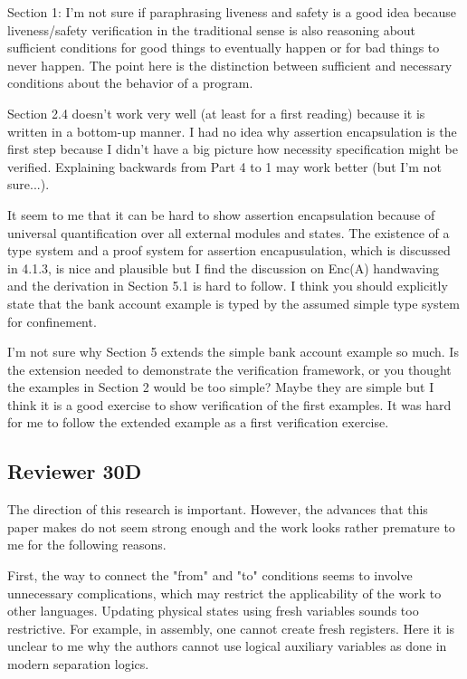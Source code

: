 \documentclass[11pt]{amsart}
\begin{document}
Section 1: I'm not sure if paraphrasing liveness and safety is a good
idea because liveness/safety verification in the traditional sense is
also reasoning about sufficient conditions for good things to
eventually happen or for bad things to never happen.  The point
here is the distinction between sufficient and necessary conditions
about the behavior of a program.

Section 2.4 doesn't work very well (at least for a first reading)
because it is written in a bottom-up manner.  I had no idea why
assertion encapsulation is the first step because I didn't have a big
picture how necessity specification might be verified.  Explaining backwards from Part 4 to 1
may work better (but I'm not sure...).

It seem to me that it can be hard to show assertion encapsulation
because of universal quantification over all external modules and
states.  The existence of a type system and a proof system for
assertion encapusulation, which is discussed in 4.1.3, is nice and
plausible but I find the discussion on Enc(A) handwaving and the
derivation in Section 5.1 is hard to follow.  I think you should
explicitly state that the bank account example is typed by the assumed
simple type system for confinement.

I'm not sure why Section 5 extends the simple bank account example so
much.  Is the extension needed to demonstrate the verification
framework, or you thought the examples in Section 2 would be too simple? 
Maybe they are simple but I think it is a good exercise to show verification of the first examples. 
It was hard for me to follow the extended example as a first verification exercise.

 \subsection*{Reviewer 30D}
 
The direction of this research is important. However, the advances that this paper makes do not seem strong enough and the work looks rather premature to me for the following reasons.

First, the way to connect the "from" and "to" conditions seems to involve unnecessary complications, which may restrict the applicability of the work to other languages. Updating physical states using fresh variables sounds too restrictive. For example, in assembly, one cannot create fresh registers. Here it is unclear to me why the authors cannot use logical auxiliary variables as done in modern separation logics.
\end{document}
